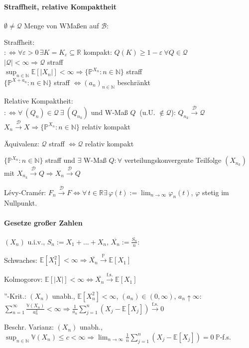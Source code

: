 \documentclass[a4paper,draft]{article}
\newcommand{\R}{\mathds{R}}
\newcommand{\N}{\mathds{N}}
\newcommand{\B}{\mathcal{B}}
\renewcommand{\P}{\mathds{P}}
\newcommand{\E}[1]{\mathds{E}[#1]}
\newcommand{\D}{\mathcal{D}}
\newcommand{\Q}{\mathcal{Q}}
\newcommand{\V}{\mathds{V}}
\newcommand{\parh}{\par\hangindent=0.5cm}
\newcommand{\konv}[1]{\overset{#1}{\longrightarrow}}
\newcommand{\fskonv}{\konv{\mathrm{f.s.}}}
\newcommand{\pkonv}{\konv{\P}}
\newcommand{\dkonv}{\konv{\D}}
\begin{document}
\begin{multicols}{2}
\paragraph{Straffheit, relative Kompaktheit}\hspace{0pt}\parh
$\emptyset\not=\Q$ Menge von WMaßen auf $\B$:\parh
Straffheit:\\
$:\Longleftrightarrow \forall \varepsilon>0\,\exists K=K_\varepsilon\subseteq \R$ kompakt: $Q(K)\geq 1-\varepsilon\:\forall Q\in\Q$\\
$|\Q|<\infty \Longrightarrow \Q$ straff\\
$\sup_{n\in\N}\E{|X_n|}<\infty \Longrightarrow \{\P^{X_n}:n\in\N\}$ straff\\
$\{\P^{X+a_n}:n\in\N\}$ straff $\Longleftrightarrow (a_n)_{n\in\N}$ beschränkt\parh
Relative Kompaktheit:\\
$:\Longleftrightarrow \forall\:(Q_n)\in\Q\:\exists\:(Q_{n_k})$ und W-Maß $Q\:${\color{red} (u.U. $\not\in\Q$)}: $Q_{n_k}\dkonv\Q$\\
$X_n\dkonv X \Longrightarrow \{\P^{X_n}:n\in\N\}$ relativ kompakt\parh
Äquivalenz: $\Q$ straff $\Longleftrightarrow \Q$ relativ kompakt\parh
$\{\P^{X_n}:n\in\N\}$ straff und $\exists$ W-Maß $Q:\forall$ verteilungskonvergente Teilfolge $(X_{n_k})$ mit $X_{n_k}\dkonv Q \Longrightarrow X_n\dkonv Q$\parh
Lévy-Cramér: $F_n\dkonv F \Longleftrightarrow \forall\,t\in\R\exists\,\varphi(t):=\lim_{n\to\infty}\varphi_n(t)$, $\varphi$ stetig im Nullpunkt.

\paragraph{Gesetze großer Zahlen}\hspace{0pt}\parh
$(X_n)$ u.i.v., $S_n:=X_1+\dots+X_n$, $\overline{X_n}:=\frac{S_n}{n}$:\parh
Schwaches: $\E{X_1^2}<\infty\Longrightarrow \overline{X_n}\pkonv \E{X_1}$\parh
Kolmogorov: $\E{|X|}<\infty \Longleftrightarrow \overline{X_n}\fskonv \E{X_1}$\parh
''-Krit.: $(X_n)$ unabh., $\E{X_n^2}<\infty$, $(a_n)\in (0,\infty)$, $a_n \uparrow \infty$:\\
$\sum_{n=1}^\infty\frac{\V(X_n)}{a_n^2}<\infty \Rightarrow \frac{1}{a_n}\sum_{j=1}^n(X_j-\E{X_j}) \fskonv 0$\parh
Beschr. Varianz: $(X_n)$ unabh., $\sup_{n\in\N}\V(X_n)\leq c< \infty\Longrightarrow\lim_{n\to\infty}\frac{1}{n}\sum_{j=1}^n(X_j-\E{X_j}) = 0\: \P$-f.s.


\end{multicols}
\end{document}
